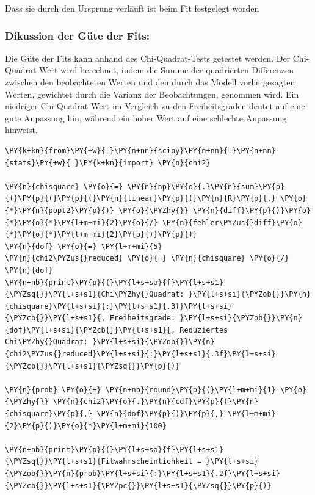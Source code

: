 Dass sie durch den Ursprung verläuft ist beim Fit festgelegt worden

    \hypertarget{dikussion-der-guxfcte-der-fits}{%
\subsubsection{Dikussion der Güte der
Fits:}\label{dikussion-der-guxfcte-der-fits}}

Die Güte der Fits kann anhand des Chi-Quadrat-Tests getestet werden. Der
Chi-Quadrat-Wert wird berechnet, indem die Summe der quadrierten
Differenzen zwischen den beobachteten Werten und den durch das Modell
vorhergesagten Werten, gewichtet durch die Varianz der Beobachtungen,
genommen wird. Ein niedriger Chi-Quadrat-Wert im Vergleich zu den
Freiheitsgraden deutet auf eine gute Anpassung hin, während ein hoher
Wert auf eine schlechte Anpassung hinweist.

    \begin{tcolorbox}[breakable, size=fbox, boxrule=1pt, pad at break*=1mm,colback=cellbackground, colframe=cellborder]
\begin{Verbatim}[commandchars=\\\{\}]
\PY{k+kn}{from}\PY{+w}{ }\PY{n+nn}{scipy}\PY{n+nn}{.}\PY{n+nn}{stats}\PY{+w}{ }\PY{k+kn}{import} \PY{n}{chi2}

\PY{n}{chisquare} \PY{o}{=} \PY{n}{np}\PY{o}{.}\PY{n}{sum}\PY{p}{(}\PY{p}{(}\PY{p}{(}\PY{n}{linear}\PY{p}{(}\PY{n}{R}\PY{p}{,} \PY{o}{*}\PY{n}{popt2}\PY{p}{)} \PY{o}{\PYZhy{}} \PY{n}{diff}\PY{p}{)}\PY{o}{*}\PY{o}{*}\PY{l+m+mi}{2}\PY{o}{/} \PY{n}{fehler\PYZus{}diff}\PY{o}{*}\PY{o}{*}\PY{l+m+mi}{2}\PY{p}{)}\PY{p}{)}
\PY{n}{dof} \PY{o}{=} \PY{l+m+mi}{5} 
\PY{n}{chi2\PYZus{}reduced} \PY{o}{=} \PY{n}{chisquare} \PY{o}{/} \PY{n}{dof}
\PY{n+nb}{print}\PY{p}{(}\PY{l+s+sa}{f}\PY{l+s+s1}{\PYZsq{}}\PY{l+s+s1}{Chi\PYZhy{}Quadrat: }\PY{l+s+si}{\PYZob{}}\PY{n}{chisquare}\PY{l+s+si}{:}\PY{l+s+s1}{.3f}\PY{l+s+si}{\PYZcb{}}\PY{l+s+s1}{, Freiheitsgrade: }\PY{l+s+si}{\PYZob{}}\PY{n}{dof}\PY{l+s+si}{\PYZcb{}}\PY{l+s+s1}{, Reduziertes Chi\PYZhy{}Quadrat: }\PY{l+s+si}{\PYZob{}}\PY{n}{chi2\PYZus{}reduced}\PY{l+s+si}{:}\PY{l+s+s1}{.3f}\PY{l+s+si}{\PYZcb{}}\PY{l+s+s1}{\PYZsq{}}\PY{p}{)}

\PY{n}{prob} \PY{o}{=} \PY{n+nb}{round}\PY{p}{(}\PY{l+m+mi}{1} \PY{o}{\PYZhy{}} \PY{n}{chi2}\PY{o}{.}\PY{n}{cdf}\PY{p}{(}\PY{n}{chisquare}\PY{p}{,} \PY{n}{dof}\PY{p}{)}\PY{p}{,} \PY{l+m+mi}{2}\PY{p}{)}\PY{o}{*}\PY{l+m+mi}{100}

\PY{n+nb}{print}\PY{p}{(}\PY{l+s+sa}{f}\PY{l+s+s1}{\PYZsq{}}\PY{l+s+s1}{Fitwahrscheinlichkeit = }\PY{l+s+si}{\PYZob{}}\PY{n}{prob}\PY{l+s+si}{:}\PY{l+s+s1}{.2f}\PY{l+s+si}{\PYZcb{}}\PY{l+s+s1}{\PYZpc{}}\PY{l+s+s1}{\PYZsq{}}\PY{p}{)}
\end{Verbatim}
\end{tcolorbox}

